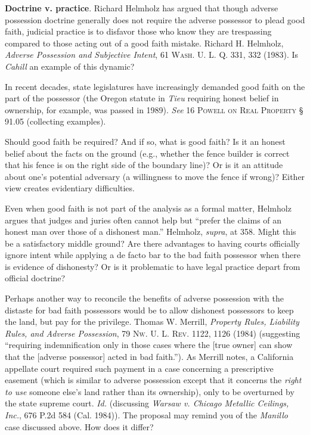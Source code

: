 \item \textbf{Doctrine v. practice}. Richard Helmholz has argued that
though adverse possession doctrine generally does not require the adverse
possessor to plead good faith, judicial practice is to disfavor those who know
they are trespassing compared to those acting out of a good faith mistake.
Richard H. Helmholz, \textit{Adverse Possession and Subjective Intent}, 61
\textsc{Wash. U. L. Q.} 331, 332 (1983). Is \textit{Cahill} an example of this
dynamic? 


In recent decades, state legislatures have increasingly demanded good faith on
the part of the possessor (the Oregon statute in \textit{Tieu} requiring honest
belief in ownership, for example, was passed in 1989). \textit{See} 16
\textsc{Powell on Real Property} {\S} 91.05 (collecting examples).

\item Should good faith be required? And if so, what is good faith? Is it an
honest belief about the facts on the ground (e.g., whether the fence builder is
correct that his fence is on the right side of the boundary line)? Or is it an
attitude about one's potential adversary (a willingness to move the fence if
wrong)? Either view creates evidentiary difficulties. 

Even when good faith is not part of the analysis as a formal matter, Helmholz
argues that judges and juries often cannot help but ``prefer the claims of an
honest man over those of a dishonest man.'' Helmholz, \textit{supra}, at 358.
Might this be a satisfactory middle ground? Are there advantages to having
courts officially ignore intent while applying a de facto bar to the bad faith
possessor when there is evidence of dishonesty? Or is it problematic to have
legal practice depart from official doctrine? 

Perhaps another way to reconcile the benefits of adverse possession with the
distaste for bad faith possessors would be to allow dishonest possessors to
keep the land, but pay for the privilege. Thomas W. Merrill, \textit{Property
Rules, Liability Rules, and Adverse Possession}, 79 \textsc{Nw. U. L. Rev}.
1122, 1126 (1984) (suggesting ``requiring indemnification only in those cases
where the [true owner] can show that the [adverse possessor] acted in bad
faith.''). As Merrill notes, a California appellate court required
such payment in a case concerning a prescriptive easement (which is similar to
adverse possession except that it concerns the \textit{right to use} someone
else's land rather than its ownership), only to be overturned by the state
supreme court. \textit{Id.} (discussing \emph{Warsaw v. Chicago Metallic
Ceilings, Inc.}, 676 P.2d 584 (Cal. 1984)). The proposal may remind you of the
\textit{Manillo} case discussed above. How does it differ? 

